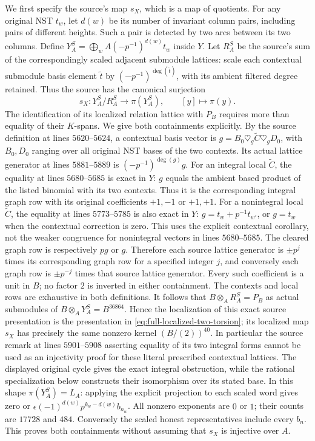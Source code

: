 We first specify the source's map $s_X$, which is a map of
quotients. For any original NST $t_w$, let $d(w)$ be its
number of invariant column pairs, including pairs of
different heights. Such a pair is detected by two arcs
between its two columns. Define
$Y_A^S=\bigoplus_w A(-p^{-1})^{d(w)}t_w$ inside $Y$.
Let $R_A^S$ be the source's sum of the correspondingly
scaled adjacent submodule lattices: scale each contextual
submodule basis element $\widetilde t$ by
$(-p^{-1})^{\deg(\widetilde t)}$, with its ambient filtered
degree retained. Thus the source has the canonical surjection
\[
 s_X:Y_A^S/R_A^S\longrightarrow\pi(Y_A^S),\qquad
 [y]\longmapsto\pi(y).
\]
The identification of its localized relation lattice
with $P_B$ requires more than equality of their
$K$-spans. We give both containments explicitly.
By the source definition at lines $5620$--$5624$, a
contextual basis vector is
$g=B_0\mathbin{\heartsuit_g}\widetilde C
\mathbin{\heartsuit_g}D_0$, with $B_0,D_0$ ranging
over all original NST bases of the two contexts.
Its actual lattice generator at lines $5881$--$5889$
is $(-p^{-1})^{\deg(g)}g$. For an integral local
$\widetilde C$, the equality at lines $5680$--$5685$
is exact in $Y$: $g$ equals the ambient based product
of the listed binomial with its two contexts. Thus it
is the corresponding integral graph row with its
original coefficients $+1,-1$ or $+1,+1$.
For a nonintegral local $\widetilde C$, the equality
at lines $5773$--$5785$ is also exact in $Y$:
$g=t_w+p^{-1}t_{w'}$, or $g=t_w$ when the contextual
correction is zero. This uses the explicit contextual
corollary, not the weaker congruence for nonintegral
vectors in lines $5680$--$5685$. The cleared graph
row is respectively $pg$ or $g$. Therefore each
source lattice generator is $\pm p^j$ times its
corresponding graph row for a specified integer $j$,
and conversely each graph row is $\pm p^{-j}$ times
that source lattice generator. Every such coefficient
is a unit in $B$; no factor $2$ is inverted in either
containment. The contexts and local rows are
exhaustive in both definitions. It follows that
$B\otimes_A R_A^S=P_B$ as actual submodules of
$B\otimes_A Y_A^S=B^{36864}$.
Hence the localization of this exact source presentation is the presentation
in \eqref{eq:full-localized-two-torsion}; its localized
map $s_X$ has precisely the same nonzero kernel
$(B/(2))^{40}$. In particular the source remark at
lines $5901$--$5908$ asserting equality of its two
integral forms cannot be used as an injectivity proof
for these literal prescribed contextual lattices.
The displayed original cycle gives the exact integral
obstruction, while the rational specialization below
constructs their isomorphism over its stated base.
In this shape $\pi(Y_A^S)=L_A$: applying the explicit
projection to each scaled word gives zero or
$\epsilon(-1)^{d(w)}p^{k_w-d(w)}b_{n_w}$.
All nonzero exponents are $0$ or $1$; their counts are
$17728$ and $484$. Conversely the scaled honest
representatives include every $b_n$. This proves both
containments without assuming that $s_X$ is injective over $A$.

